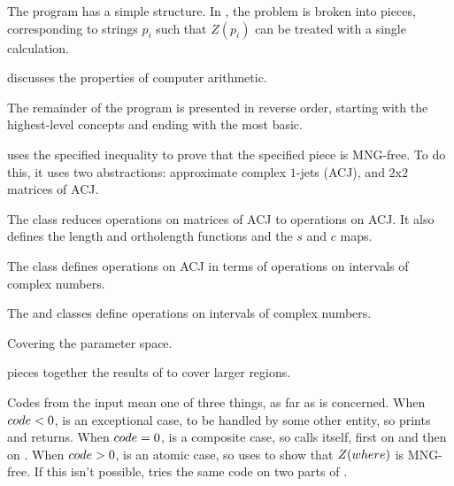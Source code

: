 \fi

The program has a simple structure.
In , the problem is broken into pieces,
corresponding to strings $p_i$ such that $Z(p_i)$ can be treated
with a single calculation.

 discusses the properties of computer arithmetic.

The remainder of the program is presented in reverse order,
starting with the highest-level concepts and ending with the most basic.

 uses the specified inequality to prove
that the specified piece is MNG-free.
To do this, it uses two abstractions:
approximate complex $1$-jets (ACJ), and 2x2 matrices of ACJ.

The  class reduces operations on matrices of ACJ
to operations on ACJ. It also defines the length and
ortholength functions and the $s$ and $c$ maps.

The  class defines operations on ACJ in terms of operations
on intervals of complex numbers.

The  and  classes define
operations on intervals of complex numbers.

\fi

Covering the parameter space.

 pieces together the results of
 to cover larger regions.

Codes from the input mean one of three things, as far as  is
concerned.
When $\relax{\\{code}} < 0$,  is an exceptional case,
to be handled by some other entity, so
 prints  and returns.
When $\relax{\\{code}} = 0$,  is a composite case, so
 calls itself, first on  and then on .
When $\relax{\\{code}} > 0$,  is an atomic case,
so  uses 
to show that $Z(\relax{\\{where}})$ is MNG-free.
If this isn't possible,  tries the same code
on two parts of .

